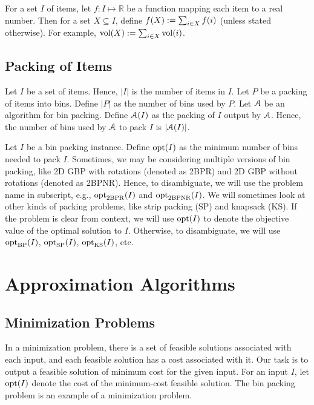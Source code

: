 For a set $I$ of items, let $f: I \mapsto \mathbb{R}$ be a function
mapping each item to a real number.
Then for a set $X \subseteq I$, define $f(X) := \sum_{i \in X} f(i)$
(unless stated otherwise).
For example, $\operatorname{vol}(X) := \sum_{i \in X} \operatorname{vol}(i)$.

\subsection{Packing of Items}

Let $I$ be a set of items. Hence, $|I|$ is the number of items in $I$.
Let $P$ be a packing of items into bins. Define $|P|$ as the number of bins used by $P$.
Let $\mathcal{A}$ be an algorithm for bin packing.
Define $\mathcal{A}(I)$ as the packing of $I$ output by $\mathcal{A}$.
Hence, the number of bins used by $\mathcal{A}$ to pack $I$ is $|\mathcal{A}(I)|$.

Let $I$ be a bin packing instance.
Define $\operatorname{opt}(I)$ as the minimum number of bins needed to pack $I$.
Sometimes, we may be considering multiple versions of bin packing,
like 2D GBP with rotations (denoted as 2BPR)
and 2D GBP without rotations (denoted as 2BPNR).
Hence, to disambiguate, we will use the problem name in subscript,
e.g., $\operatorname{opt}_{\mathrm{2BPR}}(I)$ and $\operatorname{opt}_{\mathrm{2BPNR}}(I)$.
We will sometimes look at other kinds of packing problems,
like strip packing (SP) and knapsack (KS).
If the problem is clear from context, we will use $\operatorname{opt}(I)$
to denote the objective value of the optimal solution to $I$.
Otherwise, to disambiguate, we will use $\operatorname{opt}_{\mathrm{BP}}(I)$,
$\operatorname{opt}_{\mathrm{SP}}(I)$, $\operatorname{opt}_{\mathrm{KS}}(I)$, etc.

\section{Approximation Algorithms}

\subsection{Minimization Problems}
\label{sec:appx:min}

In a minimization problem, there is a set of feasible solutions associated with each input,
and each feasible solution has a cost associated with it.
Our task is to output a feasible solution of minimum cost for the given input.
For an input $I$, let $\operatorname{opt}(I)$ denote the cost of the minimum-cost feasible solution.
The bin packing problem is an example of a minimization problem.

